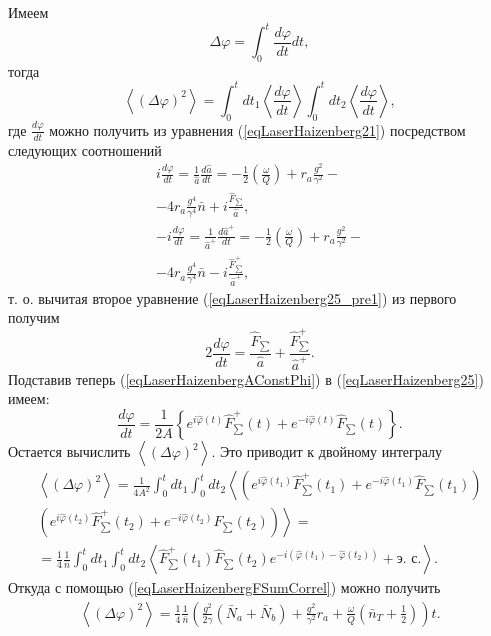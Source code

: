 Имеем
\[
\Delta \varphi = \int_0^t \frac{d \varphi}{d t}dt,
\]
тогда
\[
\left<\left(\Delta \varphi\right)^2\right> = \int_0^t d t_1 \left<\frac{d \varphi}{d t}\right>
\int_0^{t} d t_2 \left<\frac{d \varphi}{d t}\right>,
\]
где $\frac{d \varphi}{d t}$ можно получить из уравнения
(\ref{eqLaserHaizenberg21}) посредством следующих соотношений
\begin{eqnarray}
i \frac{d \varphi}{d t} = \frac{1}{\hat{a}}\frac{d
  \hat{a}}{d t} = 
-\frac{1}{2}\left(\frac{\omega}{Q}\right)
+ r_a \frac{g^2}{\gamma^2} - 
\nonumber \\
- 4 r_a\frac{g^4}{\gamma^4} \bar{n} + i \frac{\hat{F}_{\sum}}{\hat{a}},
\nonumber \\
- i \frac{d \varphi}{d t} = \frac{1}{\hat{a}^{+}}\frac{d
  \hat{a}^{+}}{d t} = 
-\frac{1}{2}\left(\frac{\omega}{Q}\right)
+ r_a \frac{g^2}{\gamma^2} - 
\nonumber \\
- 4 r_a\frac{g^4}{\gamma^4} \bar{n} - i \frac{\hat{F}^{+}_{\sum}}{\hat{a}^{+}},
\label{eqLaserHaizenberg25_pre1}
\end{eqnarray}
т. о. вычитая второе уравнение (\ref{eqLaserHaizenberg25_pre1}) из
первого получим
\begin{equation}
2 \frac{d \varphi}{d t} = 
\frac{\hat{F}_{\sum}}{\hat{a}} + \frac{\hat{F}^{+}_{\sum}}{\hat{a}^{+}}.
\label{eqLaserHaizenberg25}
\end{equation}
Подставив теперь (\ref{eqLaserHaizenbergAConstPhi}) в
(\ref{eqLaserHaizenberg25}) 
имеем:
\begin{equation}
\frac{d \varphi}{d t} = \frac{1}{2 A}
\left\{
e^{i\hat{\varphi}\left(t\right)}\hat{F}^{+}_{\sum}\left(t\right) +
e^{- i\hat{\varphi}\left(t\right)}\hat{F}_{\sum}\left(t\right)
\right\}.
\nonumber
\end{equation}
Остается вычислить  
\(
\left<\left(\Delta \varphi\right)^2\right>.
\)
Это приводит к двойному интегралу
\begin{eqnarray}
\left<\left(\Delta \varphi\right)^2\right> = 
\frac{1}{4 A^2}
\int_0^t d t_1 
\int_0^t d t_2
\left<
\left(
e^{i\hat{\varphi}\left(t_1\right)}\hat{F}^{+}_{\sum}\left(t_1\right) + 
e^{- i\hat{\varphi}\left(t_1\right)}\hat{F}_{\sum}\left(t_1\right)
\right)\right.
\nonumber \\
\left.
\left(
e^{i\hat{\varphi}\left(t_2\right)}\hat{F}^{+}_{\sum}\left(t_2\right) +
e^{- i\hat{\varphi}\left(t_2\right)}\hat{F}_{\sum}\left(t_2\right)
\right)
\right> = 
\nonumber \\
=
\frac{1}{4}\frac{1}{\bar{n}}
\int_0^t d t_1 
\int_0^t d t_2
\left<
\hat{F}^{+}_{\sum}\left(t_1\right)\hat{F}_{\sum}\left(t_2\right)e^{-i\left(
\hat{\varphi}\left(t_1\right) - \hat{\varphi}\left(t_2\right)
\right)} + \mbox{э. с.}\right>.
\nonumber
\end{eqnarray}
Откуда с помощью (\ref{eqLaserHaizenbergFSumCorrel}) можно получить
\begin{eqnarray}
\left<\left(\Delta \varphi\right)^2\right> = 
\frac{1}{4}\frac{1}{\bar{n}}
\left(
\frac{g^2}{2\gamma}\left(\bar{N}_a + \bar{N}_b\right) + \frac{g^2}{\gamma^2}r_a + 
\frac{\omega}{Q}\left(\bar{n}_T + \frac{1}{2}\right)
\right) t.
\label{eqLaserHaizenbergTaskDelta}
\end{eqnarray}

